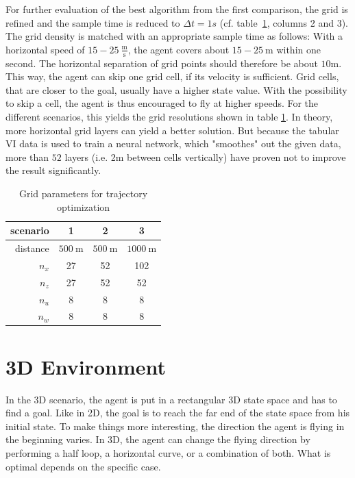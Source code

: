 For further evaluation of the best algorithm from the first comparison, the grid is refined and the sample time is reduced to $\Delta t = 1s$ (cf. table~\ref{tab:grids}, columns 2 and 3). The grid density is matched with an appropriate sample time as follows:
With a horizontal speed of $15-25 ~\frac{\text{m}}{\text{s}}$, the agent covers about $15-25~\text{m}$ within one second. The horizontal separation of grid points should therefore be about $10$m. This way, the agent can skip one grid cell, if its velocity is sufficient. Grid cells, that are closer to the goal, usually have a higher state value. With the possibility to skip a cell, the agent is thus encouraged to fly at higher speeds. For the different scenarios, this yields the grid resolutions shown in table \ref{tab:grids}. In theory, more horizontal grid layers can yield a better solution. But because the tabular VI data is used to train a neural network, which "smoothes" out the given data, more than $52$ layers (i.e. 2m between cells vertically) have proven not to improve the result significantly.

\begin{table}
	\begin{center}
		\begin{tabular}{r|c c c}
			scenario & 1 & 2 & 3 \\ \hline
			distance & $500~\text{m}$ & $500~\text{m}$ & $1000~\text{m}$ \\
			$n_x$ & 27 & 52 & 102 \\
			$n_z$ & 27 & 52 & 52\\
			$n_u$ & 8 & 8 & 8 \\
			$n_w$ & 8 & 8 & 8
		\end{tabular}
	\end{center}
	\caption{Grid parameters for trajectory optimization}
	\label{tab:grids}
\end{table}

\section{3D Environment}

In the 3D scenario, the agent is put in a rectangular 3D state space and has to find a goal. Like in 2D, the goal is to reach the far end of the state space from his initial state. To make things more interesting, the direction the agent is flying in the beginning varies. In 3D, the agent can change the flying direction by performing a half loop, a horizontal curve, or a combination of both. What is optimal depends on the specific case.

